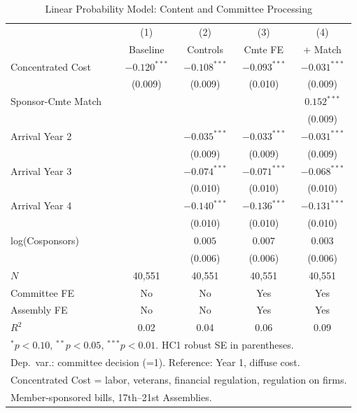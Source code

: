 \documentclass[11pt]{article}
\begin{document}
\begin{table}[htbp]
\centering
\caption{Linear Probability Model: Content and Committee Processing}
\label{tab:main}
\begin{tabular}{lcccc}
\toprule
 & (1) & (2) & (3) & (4) \\
 & Baseline & Controls & Cmte FE & + Match \\
\midrule
Concentrated Cost & $-0.120^{***}$ & $-0.108^{***}$ & $-0.093^{***}$ & $-0.031^{***}$ \\
         & (0.009) & (0.009) & (0.010) & (0.009) \\[4pt]
Sponsor-Cmte Match & & & & $0.152^{***}$ \\
                   & & & & (0.009) \\[4pt]
Arrival Year 2 & & $-0.035^{***}$ & $-0.033^{***}$ & $-0.031^{***}$ \\
               & & (0.009) & (0.009) & (0.009) \\[4pt]
Arrival Year 3 & & $-0.074^{***}$ & $-0.071^{***}$ & $-0.068^{***}$ \\
               & & (0.010) & (0.010) & (0.010) \\[4pt]
Arrival Year 4 & & $-0.140^{***}$ & $-0.136^{***}$ & $-0.131^{***}$ \\
               & & (0.010) & (0.010) & (0.010) \\[4pt]
log(Cosponsors) & & $0.005$ & $0.007$ & $0.003$ \\
                & & (0.006) & (0.006) & (0.006) \\
\midrule
$N$ & 40,551 & 40,551 & 40,551 & 40,551 \\
Committee FE & No & No & Yes & Yes \\
Assembly FE & No & No & Yes & Yes \\
$R^2$ & 0.02 & 0.04 & 0.06 & 0.09 \\
\bottomrule
\multicolumn{5}{l}{\footnotesize $^{*}p<0.10$, $^{**}p<0.05$, $^{***}p<0.01$. HC1 robust SE in parentheses.} \\
\multicolumn{5}{l}{\footnotesize Dep.\ var.: committee decision (=1). Reference: Year 1, diffuse cost.} \\
\multicolumn{5}{l}{\footnotesize Concentrated Cost = labor, veterans, financial regulation, regulation on firms.} \\
\multicolumn{5}{l}{\footnotesize Member-sponsored bills, 17th--21st Assemblies.} \\
\end{tabular}
\end{table}
\end{document}

